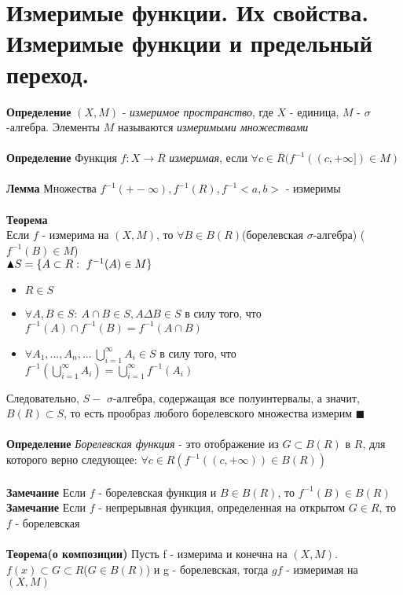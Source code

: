 \section{Измеримые функции. Их свойства. Измеримые функции и предельный переход.}
\textbf{Определение} $(X, M) $ - \textit{измеримое пространство}, где $X$ - единица, $M$ - $\sigma$-алгебра. Элементы $M$ называются \textit{измеримыми множествами}
\\
\\
\textbf{Определение} Функция $f: X \rightarrow \overline{R}$ \textit{измеримая}, если $\forall c \in \overline{R} (f^{-1}((c, +\infty]) \in M)$
\\
\\
\textbf{Лемма} Множества $f^{-1}(+- \infty), f^{-1}(R), f^{-1}<a, b>$ - измеримы
\\
\\
\textbf{Теорема}
\\
Если $f$ - измерима на $(X, M)$, то $\forall B \in B(R)$(борелевская $\sigma$-алгебра) ($f^{-1}(B) \in M$)
\\
$\blacktriangle \\ S = \{A \subset R:\ f^{-1}(A) \in M\}$
\begin{itemize}
    \item $R \in S$
     \item $\forall A, B \in S : \ A\cap B \in S, A\Delta B \in S$ в силу того, что $f^{-1}(A)\cap f^{-1}(B) = f^{-1}(A\cap B)$
     \item $\forall A_1, ..., A_n, ... \ \bigcup_{i=1}^{\infty} A_i \in S$ в силу того, что $f^{-1}(\bigcup_{i=1}^{\infty} A_i) = \bigcup_{i=1}^{\infty} f^{-1}(A_i)$
\end{itemize}
Следовательно, $S -$ $\sigma$-алгебра, содержащая все полуинтервалы, а значит, $B(R) \subset S$, то есть прообраз любого борелевского множества измерим
$\blacksquare$
\\
\\
\textbf{Определение} \textit{Борелевская функция} - это отображение из $G \subset B(R)$ в $R$, для которого верно следующее: $\forall c \in R (f^{-1}((c, +\infty)) \in B(R))$
\\
\\
\textbf{Замечание} Если  $f$ - борелевская функция и $B \in B(R)$, то $f^{-1}(B)\in B(R)$
\\
\textbf{Замечание} Если  $f$ - непрерывная функция, определенная на открытом $G \in R$, то $f$ - борелевская
\\
\\
\textbf{Теорема(о композиции)} Пусть f - измерима и конечна на $(X, M)$. $f(x) \subset G \subset R$($G \in B(R)$) и g - борелевская, тогда $gf$ - измеримая на $(X, M)$
